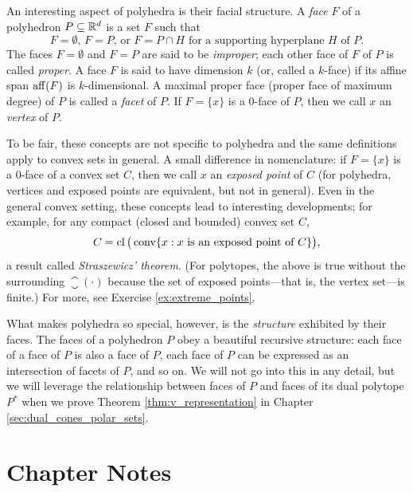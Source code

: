 An interesting aspect of polyhedra is their facial structure. A \emph{face} $F$
of a polyhedron $P \subseteq \mathbb{R}^d$ is a set $F$ such that 
\[
\text{$F = \emptyset$, $F = P$, or $F = P \cap H$ for a supporting hyperplane
  $H$ of $P$}. 
\]
The faces $F=\emptyset$ and $F=P$ are said to be \emph{improper}; each other
face of $F$ of $P$ is called \emph{proper}. A face $F$ is said to have dimension
$k$ (or, called a $k$-face) if its affine span $\operatorname{aff}(F)$ is $k$-dimensional. A
maximal proper face (proper face of maximum degree) of $P$ is called a
\emph{facet} of $P$. If $F=\{x\}$ is a $0$-face of $P$, then we call $x$ an
\emph{vertex} of $P$. 

To be fair, these concepts are not specific to polyhedra and the same
definitions apply to convex sets in general. A small difference in
nomenclature: if $F = \{x\}$ is a $0$-face of a convex set $C$, then we call $x$
an \emph{exposed point} of $C$ (for polyhedra, vertices and exposed points 
are equivalent, but not in general). Even in the general convex setting, these
concepts lead to interesting developments; for example, for any compact (closed
and bounded) convex set $C$, 
\[
C = \operatorname{cl}\big(\operatorname{conv}\{x : \text{$x$ is an exposed point of $C$}\}\big),  
\]
a result called \emph{Straszewicz' theorem}. (For polytopes, the above is true
without the surrounding $\closure(\cdot)$ because the set of exposed
points---that is, the vertex set---is finite.) For more, see Exercise
\ref{ex:extreme_points}. 

What makes polyhedra so special, however, is the \emph{structure} exhibited by
their faces. The faces of a polyhedron $P$ obey a beautiful recursive 
structure: each face of a face of $P$ is also a face of $P$, each face of $P$
can be expressed as an intersection of facets of $P$, and so on. 
We will not go into this in any detail, but we will leverage the relationship
between faces of $P$ and faces of its dual polytope $P^*$ when we prove
Theorem \ref{thm:v_representation} in Chapter \ref{sec:dual_cones_polar_sets}. 

\SkipTocEntry\section*{Chapter Notes}

